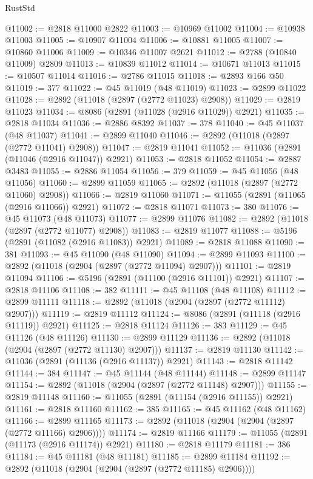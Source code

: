 \begin{lexlean}{RustStd}
\begin{coremodule}
@11002 := @2818 @11000 @2822
@11003 := @10969 @11002
@11004 := @10938 @11003
@11005 := @10907 @11004
@11006 := @10881 @11005
@11007 := @10860 @11006
@11009 := @10346 @11007 @2621
@11012 := @2788 (@10840 @11009) @2809
@11013 := @10839 @11012
@11014 := @10671 @11013
@11015 := @10507 @11014
@11016 := @2786 @11015
@11018 := @2893 @166 @50
@11019 := 377
@11022 := @45 @11019 (@48 @11019)
@11023 := @2899 @11022
@11028 := @2892 (@11018 (@2897 (@2772 @11023) @2908))
@11029 := @2819 @11023
@11034 := @8086 (@2891 (@11028 (@2916 @11029)) @2921)
@11035 := @2818 @11034
@11036 := @2886 @8392
@11037 := 378
@11040 := @45 @11037 (@48 @11037)
@11041 := @2899 @11040
@11046 := @2892 (@11018 (@2897 (@2772 @11041) @2908))
@11047 := @2819 @11041
@11052 := @11036 (@2891 (@11046 (@2916 @11047)) @2921)
@11053 := @2818 @11052
@11054 := @2887 @3483
@11055 := @2886 @11054
@11056 := 379
@11059 := @45 @11056 (@48 @11056)
@11060 := @2899 @11059
@11065 := @2892 (@11018 (@2897 (@2772 @11060) @2908))
@11066 := @2819 @11060
@11071 := @11055 (@2891 (@11065 (@2916 @11066)) @2921)
@11072 := @2818 @11071
@11073 := 380
@11076 := @45 @11073 (@48 @11073)
@11077 := @2899 @11076
@11082 := @2892 (@11018 (@2897 (@2772 @11077) @2908))
@11083 := @2819 @11077
@11088 := @5196 (@2891 (@11082 (@2916 @11083)) @2921)
@11089 := @2818 @11088
@11090 := 381
@11093 := @45 @11090 (@48 @11090)
@11094 := @2899 @11093
@11100 := @2892 (@11018 (@2904 (@2897 (@2772 @11094) @2907)))
@11101 := @2819 @11094
@11106 := @5196 (@2891 (@11100 (@2916 @11101)) @2921)
@11107 := @2818 @11106
@11108 := 382
@11111 := @45 @11108 (@48 @11108)
@11112 := @2899 @11111
@11118 := @2892 (@11018 (@2904 (@2897 (@2772 @11112) @2907)))
@11119 := @2819 @11112
@11124 := @8086 (@2891 (@11118 (@2916 @11119)) @2921)
@11125 := @2818 @11124
@11126 := 383
@11129 := @45 @11126 (@48 @11126)
@11130 := @2899 @11129
@11136 := @2892 (@11018 (@2904 (@2897 (@2772 @11130) @2907)))
@11137 := @2819 @11130
@11142 := @11036 (@2891 (@11136 (@2916 @11137)) @2921)
@11143 := @2818 @11142
@11144 := 384
@11147 := @45 @11144 (@48 @11144)
@11148 := @2899 @11147
@11154 := @2892 (@11018 (@2904 (@2897 (@2772 @11148) @2907)))
@11155 := @2819 @11148
@11160 := @11055 (@2891 (@11154 (@2916 @11155)) @2921)
@11161 := @2818 @11160
@11162 := 385
@11165 := @45 @11162 (@48 @11162)
@11166 := @2899 @11165
@11173 := @2892 (@11018 (@2904 (@2904 (@2897 (@2772 @11166) @2906))))
@11174 := @2819 @11166
@11179 := @11055 (@2891 (@11173 (@2916 @11174)) @2921)
@11180 := @2818 @11179
@11181 := 386
@11184 := @45 @11181 (@48 @11181)
@11185 := @2899 @11184
@11192 := @2892 (@11018 (@2904 (@2904 (@2897 (@2772 @11185) @2906))))

\end{coremodule}
\end{lexlean}
